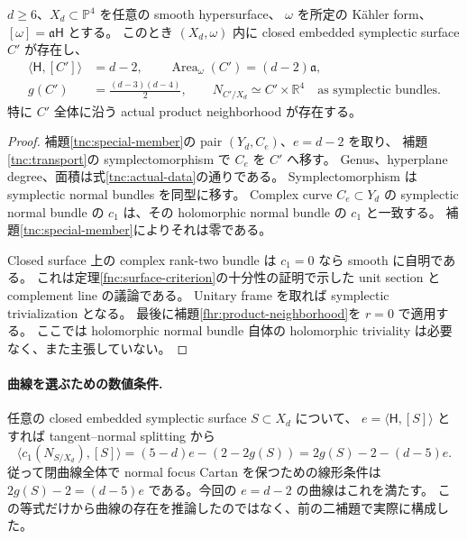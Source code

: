 \begin{theorem}\label{tnc:actual-curve}
$d\ge6$、$X_d\subset\mathbb P^4$ を任意の smooth hypersurface、
$\omega$ を所定の K\"ahler form、$[\omega]=\mathfrak a\mathsf H$ とする。
このとき $(X_d,\omega)$ 内に closed embedded symplectic surface $C'$ が存在し、
\begin{equation}\label{tnc:actual-data}
 \begin{split}
 \langle\mathsf H,[C']\rangle&=d-2,\qquad
 \operatorname{Area}_\omega(C')=(d-2)\mathfrak a,\\
 g(C')&=\frac{(d-3)(d-4)}2,\qquad
 N_{C'/X_d}\simeq C'\times\mathbb R^4
 \quad\text{as symplectic bundles}.
 \end{split}
\end{equation}
特に $C'$ 全体に沿う actual product neighborhood が存在する。
\end{theorem}

\begin{proof}
補題\ref{tnc:special-member}の pair $(Y_d,C_e)$、$e=d-2$ を取り、
補題\ref{tnc:transport}の symplectomorphism で $C_e$ を $C'$ へ移す。
Genus、hyperplane degree、面積は式\eqref{tnc:actual-data}の通りである。
Symplectomorphism は symplectic normal bundles を同型に移す。
Complex curve $C_e\subset Y_d$ の symplectic normal bundle の $c_1$ は、その holomorphic normal bundle の $c_1$ と一致する。
補題\ref{tnc:special-member}によりそれは零である。

Closed surface 上の complex rank-two bundle は $c_1=0$ なら smooth に自明である。
これは定理\ref{fnc:surface-criterion}の十分性の証明で示した unit section と complement line の議論である。
Unitary frame を取れば symplectic trivialization となる。
最後に補題\ref{fhr:product-neighborhood}を $r=0$ で適用する。
ここでは holomorphic normal bundle 自体の holomorphic triviality は必要なく、また主張していない。
\end{proof}

\paragraph{曲線を選ぶための数値条件.}
任意の closed embedded symplectic surface $S\subset X_d$ について、
$e=\langle\mathsf H,[S]\rangle$ とすれば tangent--normal splitting から
\begin{equation}\label{tnc:adjunction-balance}
 \langle c_1(N_{S/X_d}),[S]\rangle
 =(5-d)e-(2-2g(S))=2g(S)-2-(d-5)e.
\end{equation}
従って閉曲線全体で normal focus Cartan を保つための線形条件は
$2g(S)-2=(d-5)e$ である。今回の $e=d-2$ の曲線はこれを満たす。
この等式だけから曲線の存在を推論したのではなく、前の二補題で実際に構成した。

